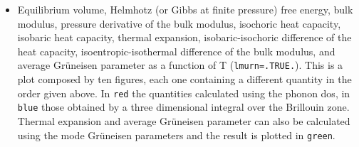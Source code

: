 \documentclass[12pt,a4paper]{article}
\begin{document}
\begin{itemize}
\item
Equilibrium volume, Helmhotz (or Gibbs at finite pressure) free energy, 
bulk modulus, pressure derivative of the bulk
modulus, isochoric heat capacity, isobaric heat capacity,
thermal expansion, isobaric-isochoric difference of the heat capacity,    
isoentropic-isothermal difference of the bulk modulus, and 
average Gr\"uneisen parameter as a function of T (\texttt{lmurn=.TRUE.}). 
This is a plot composed by ten figures, each one containing a different
quantity in the order given above. In \texttt{red} the quantities 
calculated using the phonon dos, in \texttt{blue} those
obtained by a three dimensional integral over the Brillouin zone.
Thermal expansion and average Gr\"uneisen parameter can also be 
calculated using the mode Gr\"uneisen parameters and the result is plotted in
\texttt{green}.


\end{itemize}
\end{document}
